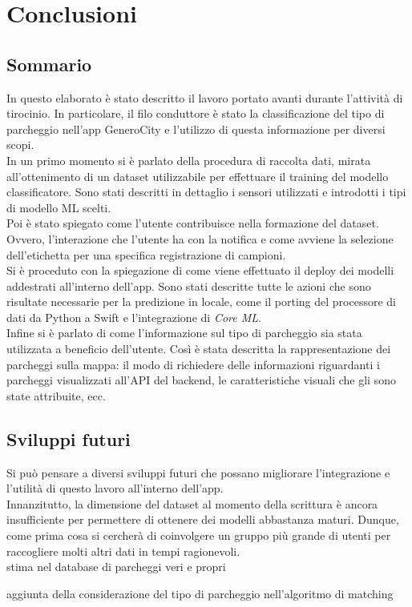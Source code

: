 \chapter{Conclusioni}

\section{Sommario}

In questo elaborato è stato descritto il lavoro portato avanti durante
l'attività di tirocinio. In particolare, il filo conduttore è stato
la classificazione del tipo di parcheggio nell'app GeneroCity 
e l'utilizzo di questa informazione per diversi scopi.\\
In un primo momento si è parlato della procedura di raccolta dati,
mirata all'ottenimento di un dataset utilizzabile per effettuare
il training del modello classificatore. Sono stati descritti in
dettaglio i sensori utilizzati e introdotti i tipi di modello ML
scelti.\\
Poi è stato spiegato come l'utente contribuisce nella formazione del
dataset. Ovvero, l'interazione che l'utente ha con la notifica e 
come avviene la selezione dell'etichetta per una specifica registrazione
di campioni.\\
Si è proceduto con la spiegazione di come viene effettuato il deploy
dei modelli addestrati all'interno dell'app. Sono stati descritte tutte 
le azioni che sono risultate necessarie per la predizione in locale, come
il porting del processore di dati da Python a Swift e l'integrazione di 
\emph{Core ML}.\\
Infine si è parlato di come l'informazione sul tipo di parcheggio sia stata
utilizzata a beneficio dell'utente. Così è stata descritta la 
rappresentazione dei parcheggi sulla mappa: il modo di richiedere delle 
informazioni riguardanti i parcheggi visualizzati all'API del backend, le
caratteristiche visuali che gli sono state attribuite, ecc.

\section{Sviluppi futuri}

Si può pensare a diversi sviluppi futuri che possano migliorare l'integrazione
e l'utilità di questo lavoro all'interno dell'app.\\
Innanzitutto, la dimensione del dataset al momento della scrittura è ancora
insufficiente per permettere di ottenere dei modelli abbastanza maturi. Dunque,
come prima cosa si cercherà di coinvolgere un gruppo più grande di utenti
per raccogliere molti altri dati in tempi ragionevoli.\\

stima nel database di parcheggi veri e propri

aggiunta della considerazione del tipo di parcheggio nell'algoritmo di matching